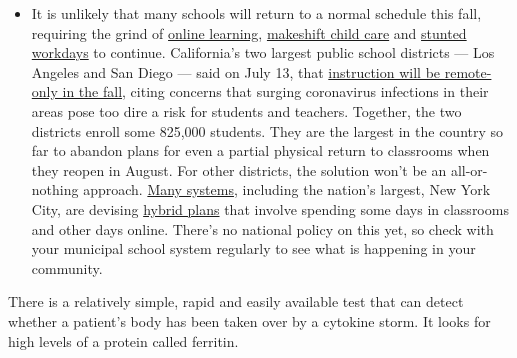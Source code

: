 \begin{itemize}
  \begin{itemize}
  \tightlist
  \item
    It is unlikely that many schools will return to a normal schedule
    this fall, requiring the grind of
    \href{https://www.nytimes3xbfgragh.onion/2020/06/05/us/coronavirus-education-lost-learning.html?action=click\&pgtype=Article\&state=default\&region=MAIN_CONTENT_3\&context=storylines_faq}{online
    learning},
    \href{https://www.nytimes3xbfgragh.onion/2020/05/29/us/coronavirus-child-care-centers.html?action=click\&pgtype=Article\&state=default\&region=MAIN_CONTENT_3\&context=storylines_faq}{makeshift
    child care} and
    \href{https://www.nytimes3xbfgragh.onion/2020/06/03/business/economy/coronavirus-working-women.html?action=click\&pgtype=Article\&state=default\&region=MAIN_CONTENT_3\&context=storylines_faq}{stunted
    workdays} to continue. California's two largest public school
    districts --- Los Angeles and San Diego --- said on July 13, that
    \href{https://www.nytimes3xbfgragh.onion/2020/07/13/us/lausd-san-diego-school-reopening.html?action=click\&pgtype=Article\&state=default\&region=MAIN_CONTENT_3\&context=storylines_faq}{instruction
    will be remote-only in the fall}, citing concerns that surging
    coronavirus infections in their areas pose too dire a risk for
    students and teachers. Together, the two districts enroll some
    825,000 students. They are the largest in the country so far to
    abandon plans for even a partial physical return to classrooms when
    they reopen in August. For other districts, the solution won't be an
    all-or-nothing approach.
    \href{https://bioethics.jhu.edu/research-and-outreach/projects/eschool-initiative/school-policy-tracker/}{Many
    systems}, including the nation's largest, New York City, are
    devising
    \href{https://www.nytimes3xbfgragh.onion/2020/06/26/us/coronavirus-schools-reopen-fall.html?action=click\&pgtype=Article\&state=default\&region=MAIN_CONTENT_3\&context=storylines_faq}{hybrid
    plans} that involve spending some days in classrooms and other days
    online. There's no national policy on this yet, so check with your
    municipal school system regularly to see what is happening in your
    community.
  \end{itemize}
\end{itemize}

There is a relatively simple, rapid and easily available test that can
detect whether a patient's body has been taken over by a cytokine storm.
It looks for high levels of a protein called ferritin.

